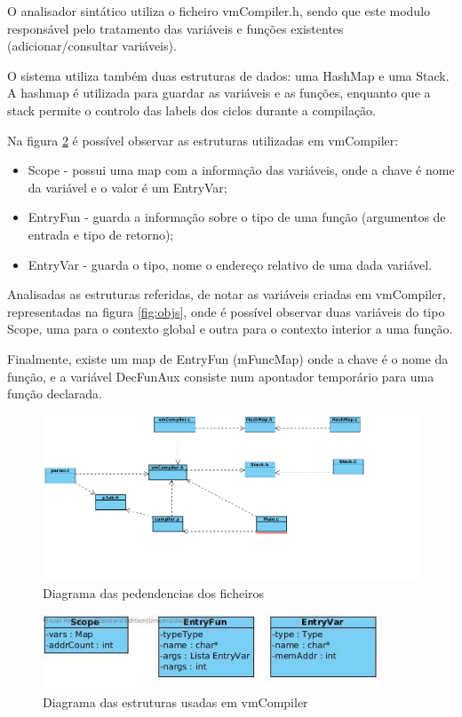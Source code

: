 \documentclass[a4paper,10pt]{report}
\begin{document}
    O analisador sintático utiliza o ficheiro vmCompiler.h, sendo que este modulo responsável pelo tratamento das variáveis e funções existentes (adicionar/consultar variáveis).

    O sistema utiliza também duas estruturas de dados: uma HashMap e uma Stack. A hashmap é utilizada para guardar as variáveis e as funções, enquanto que a stack permite o controlo das labels dos ciclos durante a compilação.

    Na figura \ref{fig:struct} é possível observar as estruturas utilizadas em vmCompiler:
    \begin{itemize}
      \item Scope - possui uma map com a informação das variáveis, onde a chave é nome da variável e o valor é um EntryVar;
      \item EntryFun - guarda a informação sobre o tipo de uma função (argumentos de entrada e tipo de retorno);
      \item EntryVar - guarda o tipo, nome o endereço relativo de uma dada variável.
    \end{itemize}

    Analisadas as estruturas referidas, de notar as variáveis criadas em vmCompiler, representadas na figura \ref{fig:objs}, onde é possível observar duas variáveis do tipo Scope, uma para o contexto global e outra para o contexto interior a uma função.

    Finalmente, existe um map de EntryFun (mFuncMap) onde a chave é o nome da função, e a variável DecFunAux consiste num apontador temporário para uma função declarada.

\begin{figure}
\centering
\includegraphics[width=15cm]{imagens/dependecias.png}
\caption{Diagrama das pedendencias dos ficheiros}
\label{fig:dependencias}
\end{figure}

\begin{figure}
\centering
\includegraphics[width=10cm]{imagens/estruturas.jpg}
\caption{Diagrama das estruturas usadas em vmCompiler}
\label{fig:struct}
\end{figure}
\end{document}
